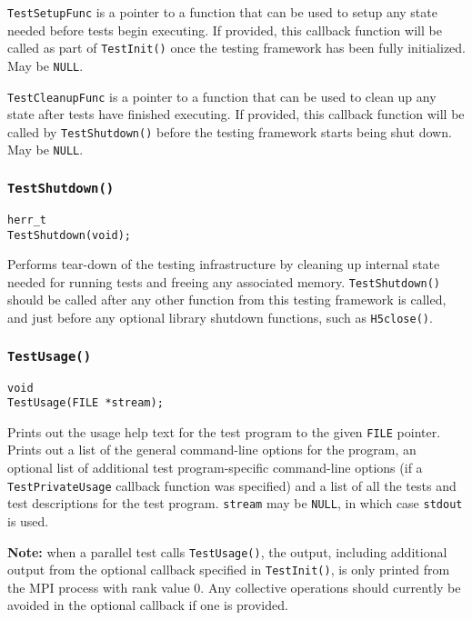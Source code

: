 \documentclass[../HDF5_RFC.tex]{subfiles}
\begin{document}
\texttt{TestSetupFunc} is a pointer to a function that can be used to setup any state needed before tests
begin executing. If provided, this callback function will be called as part of \texttt{TestInit()} once
the testing framework has been fully initialized. May be \texttt{NULL}.

\texttt{TestCleanupFunc} is a pointer to a function that can be used to clean up any state after tests
have finished executing. If provided, this callback function will be called by \texttt{TestShutdown()}
before the testing framework starts being shut down. May be \texttt{NULL}.

\subsubsection{\texttt{TestShutdown()}}

\begin{verbatim}
herr_t
TestShutdown(void);
\end{verbatim}

Performs tear-down of the testing infrastructure by cleaning up internal state needed for running
tests and freeing any associated memory. \texttt{TestShutdown()} should be called after any other function
from this testing framework is called, and just before any optional library shutdown functions, such as
\texttt{H5close()}.

\subsubsection{\texttt{TestUsage()}}

\begin{verbatim}
void
TestUsage(FILE *stream);
\end{verbatim}

Prints out the usage help text for the test program to the given \texttt{FILE} pointer. Prints out a
list of the general command-line options for the program, an optional list of additional test
program-specific command-line options (if a \texttt{TestPrivateUsage} callback function was specified)
and a list of all the tests and test descriptions for the test program. \texttt{stream} may be \texttt{NULL},
in which case \texttt{stdout} is used.

\textbf{Note:} when a parallel test calls \texttt{TestUsage()}, the output, including additional output
from the optional callback specified in \texttt{TestInit()}, is only printed from the MPI process with rank
value 0. Any collective operations should currently be avoided in the optional callback if one is provided.
\end{document}
